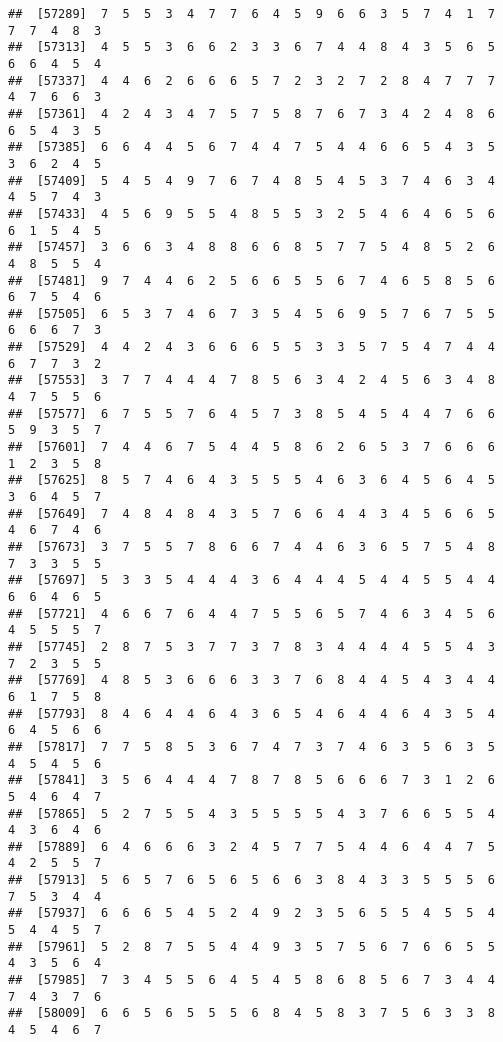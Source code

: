 \documentclass[
]{book}
\begin{document}
\begin{verbatim}
##  [57289]  7  5  5  3  4  7  7  6  4  5  9  6  6  3  5  7  4  1  7  7  7  4  8  3
##  [57313]  4  5  5  3  6  6  2  3  3  6  7  4  4  8  4  3  5  6  5  6  6  4  5  4
##  [57337]  4  4  6  2  6  6  6  5  7  2  3  2  7  2  8  4  7  7  7  4  7  6  6  3
##  [57361]  4  2  4  3  4  7  5  7  5  8  7  6  7  3  4  2  4  8  6  6  5  4  3  5
##  [57385]  6  6  4  4  5  6  7  4  4  7  5  4  4  6  6  5  4  3  5  3  6  2  4  5
##  [57409]  5  4  5  4  9  7  6  7  4  8  5  4  5  3  7  4  6  3  4  4  5  7  4  3
##  [57433]  4  5  6  9  5  5  4  8  5  5  3  2  5  4  6  4  6  5  6  6  1  5  4  5
##  [57457]  3  6  6  3  4  8  8  6  6  8  5  7  7  5  4  8  5  2  6  4  8  5  5  4
##  [57481]  9  7  4  4  6  2  5  6  6  5  5  6  7  4  6  5  8  5  6  6  7  5  4  6
##  [57505]  6  5  3  7  4  6  7  3  5  4  5  6  9  5  7  6  7  5  5  6  6  6  7  3
##  [57529]  4  4  2  4  3  6  6  6  5  5  3  3  5  7  5  4  7  4  4  6  7  7  3  2
##  [57553]  3  7  7  4  4  4  7  8  5  6  3  4  2  4  5  6  3  4  8  4  7  5  5  6
##  [57577]  6  7  5  5  7  6  4  5  7  3  8  5  4  5  4  4  7  6  6  5  9  3  5  7
##  [57601]  7  4  4  6  7  5  4  4  5  8  6  2  6  5  3  7  6  6  6  1  2  3  5  8
##  [57625]  8  5  7  4  6  4  3  5  5  5  4  6  3  6  4  5  6  4  5  3  6  4  5  7
##  [57649]  7  4  8  4  8  4  3  5  7  6  6  4  4  3  4  5  6  6  5  4  6  7  4  6
##  [57673]  3  7  5  5  7  8  6  6  7  4  4  6  3  6  5  7  5  4  8  7  3  3  5  5
##  [57697]  5  3  3  5  4  4  4  3  6  4  4  4  5  4  4  5  5  4  4  6  6  4  6  5
##  [57721]  4  6  6  7  6  4  4  7  5  5  6  5  7  4  6  3  4  5  6  4  5  5  5  7
##  [57745]  2  8  7  5  3  7  7  3  7  8  3  4  4  4  4  5  5  4  3  7  2  3  5  5
##  [57769]  4  8  5  3  6  6  6  3  3  7  6  8  4  4  5  4  3  4  4  6  1  7  5  8
##  [57793]  8  4  6  4  4  6  4  3  6  5  4  6  4  4  6  4  3  5  4  6  4  5  6  6
##  [57817]  7  7  5  8  5  3  6  7  4  7  3  7  4  6  3  5  6  3  5  4  5  4  5  6
##  [57841]  3  5  6  4  4  4  7  8  7  8  5  6  6  6  7  3  1  2  6  5  4  6  4  7
##  [57865]  5  2  7  5  5  4  3  5  5  5  5  4  3  7  6  6  5  5  4  4  3  6  4  6
##  [57889]  6  4  6  6  6  3  2  4  5  7  7  5  4  4  6  4  4  7  5  4  2  5  5  7
##  [57913]  5  6  5  7  6  5  6  5  6  6  3  8  4  3  3  5  5  5  6  7  5  3  4  4
##  [57937]  6  6  6  5  4  5  2  4  9  2  3  5  6  5  5  4  5  5  4  5  4  4  5  7
##  [57961]  5  2  8  7  5  5  4  4  9  3  5  7  5  6  7  6  6  5  5  4  3  5  6  4
##  [57985]  7  3  4  5  5  6  4  5  4  5  8  6  8  5  6  7  3  4  4  7  4  3  7  6
##  [58009]  6  6  5  6  5  5  5  6  8  4  5  8  3  7  5  6  3  3  8  4  5  4  6  7

\end{verbatim}
\end{document}
